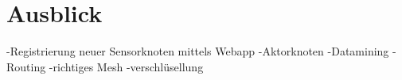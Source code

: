 \section{Ausblick}
-Registrierung neuer Sensorknoten mittels Webapp
-Aktorknoten
-Datamining
-Routing
-richtiges Mesh
-verschlüsellung